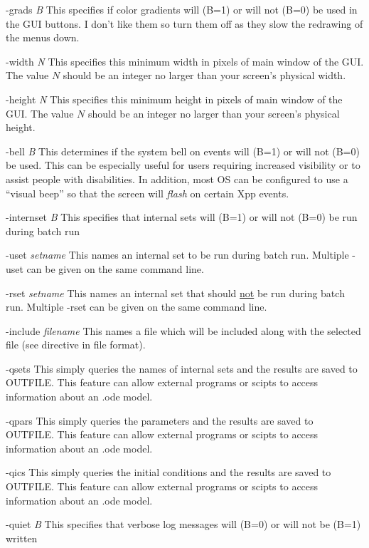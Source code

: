 \begin{description}
\item{-grads \emph{B}} This specifies if color gradients will (B=1) or will not (B=0) be used in the GUI buttons. I don't like them so turn them off as they slow the redrawing of the menus down. 
\item{-width  \emph{N}} This specifies this minimum width in pixels of main window of the GUI. The value $N$ should be an integer no larger than your screen's physical width.
\item{-height \emph{N}} This specifies this minimum height in pixels of main window of the GUI. The value $N$ should be an integer no larger than your screen's physical height.              
\item{-bell \emph{B}} This determines if the system bell on events will (B=1) or will not (B=0) be used.  This can be especially useful
for users requiring increased visibility or to assist people with disabilities.  In addition, most OS can be configured to use a ``visual beep''
so that the screen will \emph{flash} on certain Xpp events. 
\item{-internset \emph{B}} This specifies that internal sets will (B=1) or will not (B=0) be run during batch run
\item{-uset \emph{setname}}  This names an internal set to be run during batch run.  Multiple -uset can be given on the same command line.
\item{-rset \emph{setname}} This names an internal set that should \underline{not} be run during batch run. Multiple -rset can be given on the same command line.
\item{-include \emph{filename}} This names a file which will be included along with the selected {} file (see {} directive in {} file format).
\item{-qsets} This simply queries the names of internal sets and the results are saved to OUTFILE.  This feature can allow 
external programs or scipts to access information about an .ode model. 
\item{-qpars} This simply queries the  parameters and the results are saved to OUTFILE.  This feature can allow 
external programs or scipts to access information about an .ode model.
\item{-qics} This simply queries the initial conditions and the results are saved to OUTFILE.  This feature can allow 
external programs or scipts to access information about an .ode model.          
 \item{-quiet \emph{B}}  This specifies that verbose log messages will (B=0) or will not be (B=1) written

\end{description}
